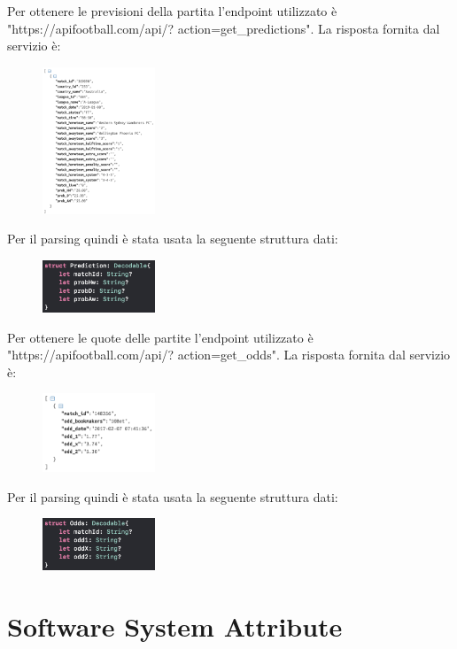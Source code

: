 \documentclass[numbers=noenddot, 12pt, a4paper, oneside]{scrbook}
\begin{document}
Per ottenere le previsioni della partita l'endpoint utilizzato è "https://apifootball.com/api/? action=get\_predictions". La risposta fornita dal servizio è:
\begin{figure}[H]
	\centering
	\includegraphics[width=0.3\textwidth]{images/ResponsePrediction}
\end{figure}
Per il parsing quindi è stata usata la seguente struttura dati:
\begin{figure}[H]
	\centering
	\includegraphics[width=0.3\textwidth]{images/StructPrediction}
\end{figure}
Per ottenere le quote delle partite l'endpoint utilizzato è "https://apifootball.com/api/? action=get\_odds". La risposta fornita dal servizio è:
\begin{figure}[H]
	\centering
	\includegraphics[width=0.3\textwidth]{images/ResponseOdds}
\end{figure}
Per il parsing quindi è stata usata la seguente struttura dati:
\begin{figure}[H]
	\centering
	\includegraphics[width=0.3\textwidth]{images/StructOdds}
\end{figure}


\chapter{Software System Attribute}
\end{document}
